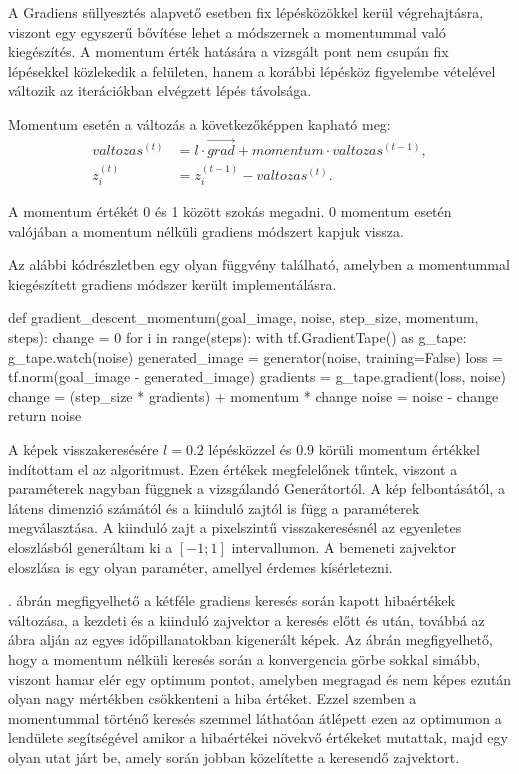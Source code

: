 A Gradiens süllyesztés alapvető esetben fix lépésközökkel kerül végrehajtásra, viszont egy egyszerű bővítése lehet a módszernek a momentummal való kiegészítés. A momentum érték hatására a vizsgált pont nem csupán fix lépésekkel közlekedik a felületen, hanem a korábbi lépésköz figyelembe vételével változik az iterációkban elvégzett lépés távolsága.

Momentum esetén a változás a következőképpen kapható meg:
\begin{align*}
valtozas^{(t)} &= l \cdot \vec{grad} + momentum \cdot valtozas^{(t-1)}, \\
z_i^{(t)} &= z_i^{(t-1)} - valtozas^{(t)}.
\end{align*}

A momentum értékét 0 és 1 között szokás megadni. 0 momentum esetén valójában a momentum nélküli gradiens módszert kapjuk vissza.

Az alábbi kódrészletben egy olyan függvény található, amelyben a momentummal kiegészített gradiens módszer került implementálásra.
\begin{python}
def gradient_descent_momentum(goal_image, noise, step_size,
                              momentum, steps):
    change = 0
    for i in range(steps):
        with tf.GradientTape() as g_tape:
            g_tape.watch(noise)
            generated_image = generator(noise, training=False)
            loss = tf.norm(goal_image - generated_image)
        gradients = g_tape.gradient(loss, noise)
        change = (step_size * gradients) + momentum * change
        noise = noise - change
    return noise
\end{python}

A képek visszakeresésére $l=0.2$ lépésközzel és $0.9$ körüli momentum értékkel indítottam el az algoritmust. Ezen értékek megfelelőnek tűntek, viszont a paraméterek nagyban függnek a vizsgálandó Generátortól. A kép felbontásától, a látens dimenzió számától és a kiinduló zajtól is függ a paraméterek megválasztása.
A kiinduló zajt a pixelszintű visszakeresésnél az egyenletes eloszlásból generáltam ki a $[-1; 1]$ intervallumon. A bemeneti zajvektor eloszlása is egy olyan paraméter, amellyel érdemes kísérletezni.

. ábrán megfigyelhető a kétféle gradiens keresés során kapott hibaértékek változása, a kezdeti és a kiinduló zajvektor a keresés előtt és után, továbbá az ábra alján az egyes időpillanatokban kigenerált képek. Az ábrán megfigyelhető, hogy a momentum nélküli keresés során a konvergencia görbe sokkal simább, viszont hamar elér egy optimum pontot, amelyben megragad és nem képes ezután olyan nagy mértékben csökkenteni a hiba értéket. Ezzel szemben a momentummal történő keresés szemmel láthatóan átlépett ezen az optimumon a lendülete segítségével amikor a hibaértékei növekvő értékeket mutattak, majd egy olyan utat járt be, amely során jobban közelítette a keresendő zajvektort.

